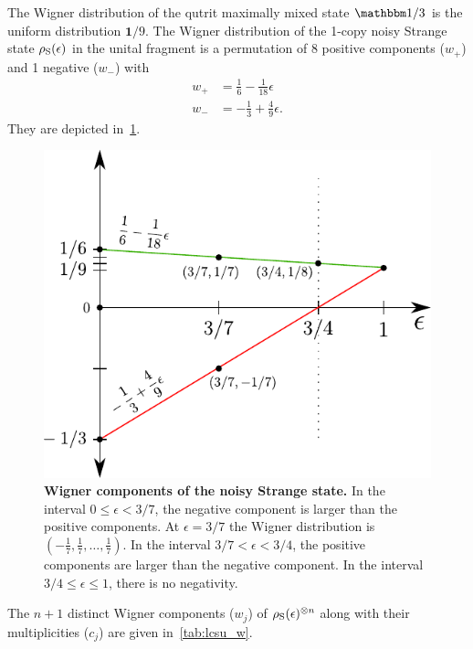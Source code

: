 \documentclass[pra,
aps,
twocolumn,
superscriptaddress,
groupedaddress,
nofootinbib,
reprint
]{revtex4-1}
\begin{document}
The Wigner distribution of the qutrit maximally mixed state $\id/3$ is the uniform distribution $\bm{1}/9$.
The Wigner distribution of the 1-copy noisy Strange state $\rho_{\rm{S}}(\epsilon)$ in the unital fragment is a permutation of 8 positive components ($w_+$) and 1 negative ($w_-$) with
\begin{align}
	w_+ &= \frac{1}{6} - \frac{1}{18}\epsilon \\
	w_- &= -\frac{1}{3} + \frac{4}{9}\epsilon.
\end{align}
They are depicted in~\cref{fig:noisys}.
\begin{figure}[t]
    \centering
    \includegraphics[scale=0.7]{figs/noisys.pdf}
    \caption{\textbf{Wigner components of the noisy Strange state.} 
    In the interval $0 \leq \epsilon < 3/7$, the negative component is larger than the positive components.
    At $\epsilon = 3/7$ the Wigner distribution is $(-\frac{1}{7},\frac{1}{7},\dots,\frac{1}{7})$.
    In the interval $3/7 < \epsilon < 3/4$, the positive components are larger than the negative component.
    In the interval $3/4 \leq \epsilon \leq 1$, there is no negativity.
    }
    \label{fig:noisys}
\end{figure}
The $n+1$ distinct Wigner components ($w_j$) of $\rho_{\rm{S}}(\epsilon)^{\otimes n}$ along with their multiplicities ($c_j$) are given in~\cref{tab:lcsu_w}.
\end{document}
